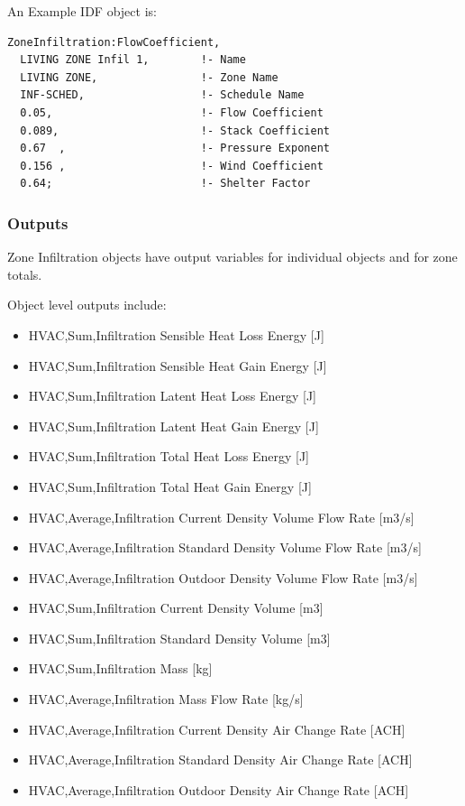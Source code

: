 An Example IDF object is:

\begin{lstlisting}
ZoneInfiltration:FlowCoefficient,
  LIVING ZONE Infil 1,        !- Name
  LIVING ZONE,                !- Zone Name
  INF-SCHED,                  !- Schedule Name
  0.05,                       !- Flow Coefficient
  0.089,                      !- Stack Coefficient
  0.67  ,                     !- Pressure Exponent
  0.156 ,                     !- Wind Coefficient
  0.64;                       !- Shelter Factor
\end{lstlisting}

\subsubsection{Outputs}\label{outputs-003}

Zone Infiltration objects have output variables for individual objects and for zone totals.

Object level outputs include:

\begin{itemize}
\item
  HVAC,Sum,Infiltration Sensible Heat Loss Energy {[}J{]}
\item
  HVAC,Sum,Infiltration Sensible Heat Gain Energy {[}J{]}
\item
  HVAC,Sum,Infiltration Latent Heat Loss Energy {[}J{]}
\item
  HVAC,Sum,Infiltration Latent Heat Gain Energy {[}J{]}
\item
  HVAC,Sum,Infiltration Total Heat Loss Energy {[}J{]}
\item
  HVAC,Sum,Infiltration Total Heat Gain Energy {[}J{]}
\item
  HVAC,Average,Infiltration Current Density Volume Flow Rate {[}m3/s{]}
\item
  HVAC,Average,Infiltration Standard Density Volume Flow Rate {[}m3/s{]}
\item
  HVAC,Average,Infiltration Outdoor Density Volume Flow Rate {[}m3/s{]}
\item
  HVAC,Sum,Infiltration Current Density Volume {[}m3{]}
\item
  HVAC,Sum,Infiltration Standard Density Volume {[}m3{]}
\item
  HVAC,Sum,Infiltration Mass {[}kg{]}
\item
  HVAC,Average,Infiltration Mass Flow Rate {[}kg/s{]}
\item
  HVAC,Average,Infiltration Current Density Air Change Rate {[}ACH{]}
\item
  HVAC,Average,Infiltration Standard Density Air Change Rate {[}ACH{]}
\item
  HVAC,Average,Infiltration Outdoor Density Air Change Rate {[}ACH{]}
\end{itemize}


